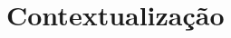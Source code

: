 \documentclass[
	12pt,				%
	openright,			%
	twoside,			%
	a4paper,			%
	english,			%
	french,				%
	spanish,			%
	brazil,				%
	]{abntex2}
\begin{document}

\frenchspacing 


\imprimircapa

\imprimirfolhaderosto


\listoffigures*
\cleardoublepage




\tableofcontents*
\cleardoublepage


\textual

\chapter[Contextualização]{Contextualização}
\end{document}
